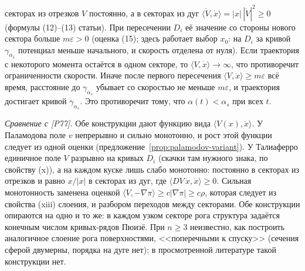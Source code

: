 \documentclass[11pt,a4paper]{article}
\theoremstyle{definition}
\newcommand{\eps}{\varepsilon}
\begin{document}
\begin{enumerate}[leftmargin=*]
секторах из отрезков $V$ постоянно, а в секторах из дуг $\langle\dot V,\dot x\rangle=|x|\,|\dot V|^2\ge0$
(формулы (12)--(13) статьи). При пересечении $D_i$ её значение со стороны нового сектора больше
$m\eps>0$ (оценка (15); здесь работает выбор $x_0$: на $D_i$ за кривой $\gamma_{\alpha_1}$ потенциал меньше
начального, и скорость отделена от нуля). Если траектория с некоторого момента остаётся в одном
секторе, то $\langle V,\dot x\rangle\to\infty$, что противоречит ограниченности скорости. Иначе после первого
пересечения $\langle V,\dot x\rangle\ge m\eps$ всё время, расстояние до $\gamma_{\alpha_s}$ убывает со скоростью не
меньше $m\eps$, и траектория достигает кривой $\gamma_{\alpha_s}$. Это противоречит тому, что
$\alpha(t)<\alpha_s$ при всех $t$.
\end{enumerate}

\emph{Сравнение с [P77].} Обе конструкции дают функцию вида $\langle V(x),\dot x\rangle$. У Паламодова поле
$v$ непрерывно и сильно монотонно, и рост этой функции следует из одной оценки
(предложение~\ref{prop:palamodov-variant}). У Талиаферро единичное поле $V$ разрывно на кривых $D_i$
(скачки там нужного знака, по свойству (x)), а на каждом куске лишь слабо монотонно: постоянно в
секторах из отрезков и равно $x/|x|$ в секторах из дуг, где $\langle DV\,\dot x,\dot x\rangle\ge0$. Сильная
монотонность заменена оценкой $\langle V,-\nabla\pi\rangle\ge c|\nabla\pi|\ge c\rho$, которая следует из свойства (xiii)
слоения, и разбором переходов между секторами. Обе конструкции опираются на одно и то же: в каждом
узком секторе рога структура задаётся конечным числом кривых-рядов Пюизё. При $n\ge3$ неизвестно,
как построить аналогичное слоение рога поверхностями, <<поперечными к спуску>> (сечения сферой
двумерны, порядка на дуге нет); в просмотренной литературе такой конструкции нет.
\end{document}
